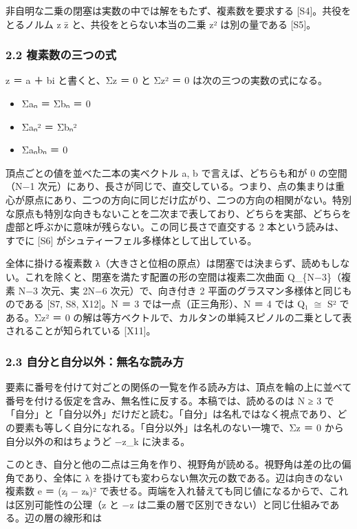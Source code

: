 \documentclass[
  a4paper,
]{ltjsarticle}
\providecommand{\tightlist}{%
  \setlength{\itemsep}{0pt}\setlength{\parskip}{0pt}}
\begin{document}
非自明な二乗の閉塞は実数の中では解をもたず、複素数を要求する
{[}S4{]}。共役をとるノルム z z̄ と、共役をとらない本当の二乗 z²
は別の量である {[}S5{]}。

\subsubsection{2.2
複素数の三つの式}\label{ux8907ux7d20ux6570ux306eux4e09ux3064ux306eux5f0f}

z ＝ a ＋ bi と書くと、Σz ＝ 0 と Σz² ＝ 0 は次の三つの実数の式になる。

\begin{itemize}
\tightlist
\item
  Σaₙ ＝ Σbₙ ＝ 0
\item
  Σaₙ² ＝ Σbₙ²
\item
  Σaₙbₙ ＝ 0
\end{itemize}

頂点ごとの値を並べた二本の実ベクトル a, b で言えば、どちらも和が 0
の空間（N−1
次元）にあり、長さが同じで、直交している。つまり、点の集まりは重心が原点にあり、二つの方向に同じだけ広がり、二つの方向の相関がない。特別な原点も特別な向きもないことを二次まで表しており、どちらを実部、どちらを虚部と呼ぶかに意味が残らない。この同じ長さで直交する
2 本という読みは、すでに {[}S6{]}
がシュティーフェル多様体として出している。

全体に掛ける複素数
λ（大きさと位相の原点）は閉塞では決まらず、読めもしない。これを除くと、閉塞を満たす配置の形の空間は複素二次曲面
Q\_\{N−3\}（複素 N−3 次元、実 2N−6 次元）で、向き付き 2
平面のグラスマン多様体と同じものである {[}S7, S8, X12{]}。N ＝ 3
では一点（正三角形）、N ＝ 4 では Q₁ \(\cong\) S² である。Σz² ＝ 0
の解は等方ベクトルで、カルタンの単純スピノルの二乗として表されることが知られている
{[}X11{]}。

\subsubsection{2.3
自分と自分以外：無名な読み方}\label{ux81eaux5206ux3068ux81eaux5206ux4ee5ux5916ux7121ux540dux306aux8aadux307fux65b9}

要素に番号を付けて対ごとの関係の一覧を作る読み方は、頂点を輪の上に並べて番号を付ける仮定を含み、無名性に反する。本稿では、読めるのは
N ≥ 3
で「自分」と「自分以外」だけだと読む。「自分」は名札ではなく視点であり、どの要素も等しく自分になれる。「自分以外」は名札のない一塊で、Σz
＝ 0 から自分以外の和はちょうど −z\_k に決まる。

このとき、自分と他の二点は三角を作り、視野角が読める。視野角は差の比の偏角であり、全体に
λ を掛けても変わらない無次元の数である。辺は向きのない複素数 e ＝ (zⱼ −
zₖ)²
で表せる。両端を入れ替えても同じ値になるからで、これは区別可能性の公理（z
と −z は二乗の層で区別できない）と同じ仕組みである。辺の層の線形和は
\end{document}
